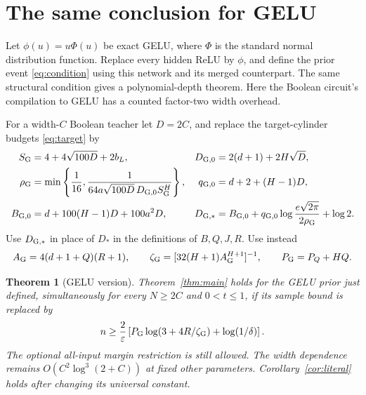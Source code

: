 \documentclass[11pt]{article}
\newtheorem{theorem}{Theorem}
\begin{document}
\section{The same conclusion for GELU}\label{sec:gelu}
Let $\phi(u)=u\Phi(u)$ be exact GELU, where $\Phi$ is the standard
normal distribution function. Replace every hidden ReLU by $\phi$,
and define the prior event \eqref{eq:condition} using this network and
its merged counterpart. The same structural condition gives a
polynomial-depth theorem. Here the Boolean circuit's compilation to
GELU has a counted factor-two width overhead.

For a width-$C$ Boolean teacher let $D=2C$, and replace the target-cylinder
budgets \eqref{eq:target} by
\begin{align*}
 S_{\rm G}&=4+4\sqrt{100D}+2b_L,&
 D_{\rm G,0}&=2(d+1)+2H\sqrt D,\\
 \rho_{\rm G}&=\min\left\{\frac1{16},
 \frac1{64a\sqrt{100D}\,D_{\rm G,0}S_{\rm G}^H}\right\},&
 q_{\rm G,0}&=d+2+(H-1)D,\\
 B_{\rm G,0}&=d+100(H-1)D+100a^2D,&
 D_{\rm G,*}&=B_{\rm G,0}
 +q_{\rm G,0}\log\frac{e\sqrt{2\pi}}{2\rho_{\rm G}}+\log2.
\end{align*}
Use $D_{\rm G,*}$ in place of $D_*$ in the definitions of $B,Q,J,R$.
Use instead
\[
 A_{\rm G}=4(d+1+Q)(R+1),\qquad
 \zeta_{\rm G}=[32(H+1)A_{\rm G}^{H+1}]^{-1},\qquad
 P_{\rm G}=P_Q+HQ.
\]
\begin{theorem}[GELU version]\label{thm:gelu}
Theorem~\ref{thm:main} holds for the GELU prior just defined,
simultaneously for every $N\ge2C$ and $0<t\le1$, if its sample bound
is replaced by
\[
 n\ge\frac2\varepsilon\left[
 P_{\rm G}\log(3+4R/\zeta_{\rm G})+\log(1/\delta)\right].
\]
The optional all-input margin restriction is still allowed.
The width dependence remains $O(C^2\log^3(2+C))$ at fixed other
parameters. Corollary~\ref{cor:literal} holds after changing its
universal constant.
\end{theorem}
\end{document}
